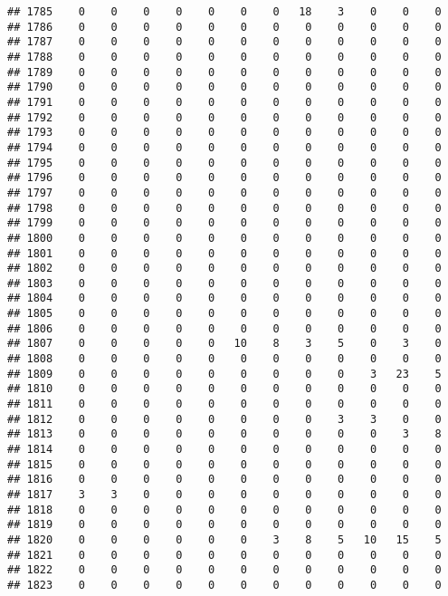 \documentclass[]{article}
\begin{document}
\begin{verbatim}
## 1785    0    0    0    0    0    0    0   18    3    0    0    0
## 1786    0    0    0    0    0    0    0    0    0    0    0    0
## 1787    0    0    0    0    0    0    0    0    0    0    0    0
## 1788    0    0    0    0    0    0    0    0    0    0    0    0
## 1789    0    0    0    0    0    0    0    0    0    0    0    0
## 1790    0    0    0    0    0    0    0    0    0    0    0    0
## 1791    0    0    0    0    0    0    0    0    0    0    0    0
## 1792    0    0    0    0    0    0    0    0    0    0    0    0
## 1793    0    0    0    0    0    0    0    0    0    0    0    0
## 1794    0    0    0    0    0    0    0    0    0    0    0    0
## 1795    0    0    0    0    0    0    0    0    0    0    0    0
## 1796    0    0    0    0    0    0    0    0    0    0    0    0
## 1797    0    0    0    0    0    0    0    0    0    0    0    0
## 1798    0    0    0    0    0    0    0    0    0    0    0    0
## 1799    0    0    0    0    0    0    0    0    0    0    0    0
## 1800    0    0    0    0    0    0    0    0    0    0    0    0
## 1801    0    0    0    0    0    0    0    0    0    0    0    0
## 1802    0    0    0    0    0    0    0    0    0    0    0    0
## 1803    0    0    0    0    0    0    0    0    0    0    0    0
## 1804    0    0    0    0    0    0    0    0    0    0    0    0
## 1805    0    0    0    0    0    0    0    0    0    0    0    0
## 1806    0    0    0    0    0    0    0    0    0    0    0    0
## 1807    0    0    0    0    0   10    8    3    5    0    3    0
## 1808    0    0    0    0    0    0    0    0    0    0    0    0
## 1809    0    0    0    0    0    0    0    0    0    3   23    5
## 1810    0    0    0    0    0    0    0    0    0    0    0    0
## 1811    0    0    0    0    0    0    0    0    0    0    0    0
## 1812    0    0    0    0    0    0    0    0    3    3    0    0
## 1813    0    0    0    0    0    0    0    0    0    0    3    8
## 1814    0    0    0    0    0    0    0    0    0    0    0    0
## 1815    0    0    0    0    0    0    0    0    0    0    0    0
## 1816    0    0    0    0    0    0    0    0    0    0    0    0
## 1817    3    3    0    0    0    0    0    0    0    0    0    0
## 1818    0    0    0    0    0    0    0    0    0    0    0    0
## 1819    0    0    0    0    0    0    0    0    0    0    0    0
## 1820    0    0    0    0    0    0    3    8    5   10   15    5
## 1821    0    0    0    0    0    0    0    0    0    0    0    0
## 1822    0    0    0    0    0    0    0    0    0    0    0    0
## 1823    0    0    0    0    0    0    0    0    0    0    0    0

\end{verbatim}
\end{document}
